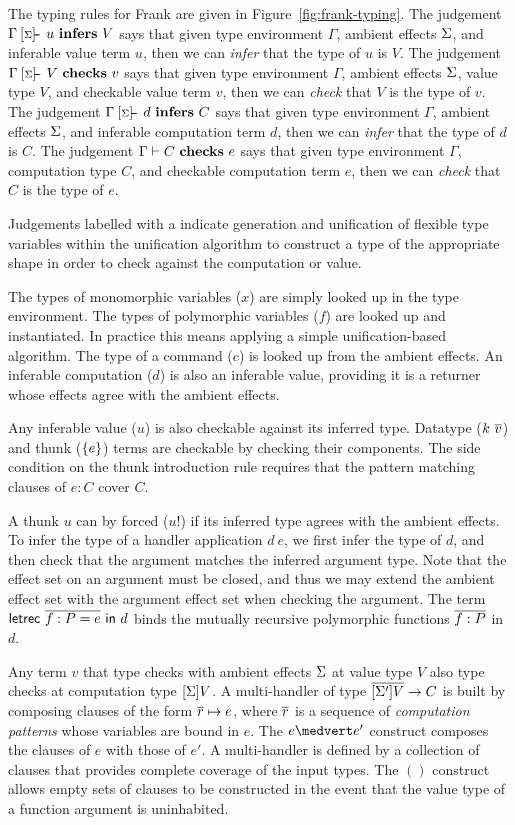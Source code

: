 The typing rules for Frank are given in Figure~\ref{fig:frank-typing}.
%
The judgement $\makesgs{u}{V}$ says that given type environment
$\Gamma$, ambient effects $\Sigma$, and inferable value term $u$, then
we can \emph{infer} that the type of $u$ is $V$.
%
The judgement $\hasgs{V}{v}$ says that given type environment
$\Gamma$, ambient effects $\Sigma$, value type $V$, and checkable value
term $v$, then we can \emph{check} that $V$ is the type of $v$.
%
The judgement $\cangs{d}{C}$ says that given type environment
$\Gamma$, ambient effects $\Sigma$, and inferable computation term $d$,
then we can \emph{infer} that the type of $d$ is $C$.
%
The judgement $\Gamma \vdash {C} ~\mathbf{checks}~ {e}$ says that given type environment
$\Gamma$, computation type $C$, and checkable computation term $e$,
then we can \emph{check} that $C$ is the type of $e$.

Judgements labelled with a \Star{} indicate generation and unification of
flexible type variables within the unification algorithm to construct a type
of the appropriate shape in order to check against the computation or value.

The types of monomorphic variables ($x$) are simply looked up in the
type environment. The types of polymorphic variables ($f$) are looked
up and instantiated. In practice this means applying a simple
unification-based algorithm.
%
The type of a command ($c$) is looked up from the ambient effects.
%
An inferable computation ($d$) is also an inferable value, providing
it is a returner whose effects agree with the ambient effects.

Any inferable value ($u$) is also checkable against its inferred
type. Datatype ($k~\overline{v}$) and thunk ($\{{e}\}$) terms are
checkable by checking their components. The side condition on the
thunk introduction rule requires that the pattern matching clauses of
$e : C$ cover $C$.

A thunk $u$ can by forced ($u!$) if its inferred type agrees with the
ambient effects. To infer the type of a handler application $d~e$, we
first infer the type of $d$, and then check that the argument matches
the inferred argument type. Note that the effect set on an argument
must be closed, and thus we may extend the ambient effect set with the
argument effect set when checking the argument.
%
%
The term $\mathsf{letrec}~\overline{f : P = e}~\mathsf{in}~d$ binds the mutually
recursive polymorphic functions $\overline{f:P}$ in $d$.

Any term $v$ that type checks with ambient effects $\Sigma$ at value
type $V$ also type checks at computation type $[\Sigma]V$.
%
A multi-handler of type $\overline{[\Sigma']V} \to C$ is built by
composing clauses of the form $\overline{r} \mapsto e$, where $\overline{r}$
is a sequence of \emph{computation patterns} whose variables are bound
in $e$.
%
The $e \medvert e'$ construct composes the clauses of $e$ with those
of $e'$. A multi-handler is defined by a collection of clauses that
provides complete coverage of the input types.
%
The $()$ construct allows empty sets of clauses to be constructed in
the event that the value type of a function argument is uninhabited.

